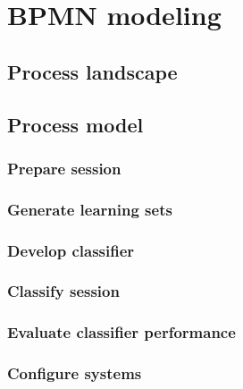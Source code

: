 \section{BPMN modeling}
\label{sec:bpmn_modeling}

\subsection{Process landscape}

\subsection{Process model}

\subsubsection{Prepare session}
\label{sec:prepare_session}

\subsubsection{Generate learning sets}
\label{sec:generate_learning_sets}

\subsubsection{Develop classifier}
\label{sec:develop_classifier}

\subsubsection{Classify session}
\label{sec:classify_session}

\subsubsection{Evaluate classifier performance}
\label{sec:evaluate_classifier_performance}

\subsubsection{Configure systems}
\label{sec:configure_systems}